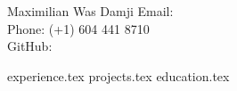\documentclass[letterpaper,11pt]{article}
\begin{document}
\headinginline
{
    Maximilian Was Damji
}
{
    Email:  \\
    Phone: (+1) 604 441 8710 \\
    GitHub: 
}

\rule{0pt}{1ex}

{experience.tex}
{projects.tex}
{education.tex}
\end{document}
